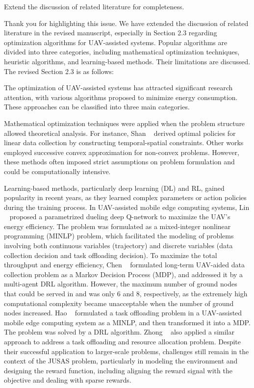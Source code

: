 \begin{metacomment}
	Extend the discussion of related literature for completeness.
\end{metacomment}
\begin{metaresponse}
	Thank you for highlighting this issue.
	We have extended the discussion of related literature in the revised manuscript, especially in Section 2.3 regarding optimization algorithms for UAV-assisted systems.
	Popular algorithms are divided into three categories, including mathematical optimization techniques, heuristic algorithms, and learning-based methods. Their limitations are discussed.
	The revised Section 2.3 is as follows:
	\begin{changes}
		The optimization of UAV-assisted systems has attracted significant research attention, with various algorithms proposed to minimize energy consumption. 
		These approaches can be classified into three main categories.

		Mathematical optimization techniques were applied when the problem structure allowed theoretical analysis. 
		For instance, Shan \etal~\cite{SLXWL-INFOCOM20} derived optimal policies for linear data collection by constructing temporal-spatial constraints. 
		Other works~\cite{b-math1,b-math2} employed successive convex approximation for non-convex problems. 
		However, these methods often imposed strict assumptions on problem formulation and could be computationally intensive.

		Learning-based methods, particularly deep learning (DL) and RL, gained popularity in recent years, as they learned complex parameters or action policies during the training process.
		In UAV-assisted mobile edge computing systems, Lin \etal~\cite{b-DL} proposed a parametrized dueling deep Q-network to maximize the UAV's energy efficiency.
		The problem was formulated as a mixed-integer nonlinear programming (MINLP) problem, which facilitated the modeling of problems involving both continuous variables (\eg trajectory) and discrete variables (\eg data collection decision and task offloading decision).
		To maximize the total throughput and energy efficiency, Chen \etal~\cite{b-RL} formulated long-term UAV-aided data collection problem as a Markov Decision Process (MDP), and addressed it by a multi-agent DRL algorithm.
		However, the maximum number of ground nodes that could be served in \cite{b-DL} and \cite{b-RL} was only 6 and 8, respectively, as the extremely high computational complexity became unacceptable when the number of ground nodes increased.
		Hao \etal~\cite{hao-minlp} formulated a task offloading problem in a UAV-assisted mobile edge computing system as a MINLP, and then transformed it into a MDP.
		The problem was solved by a DRL algorithm.
		Zhong \etal~\cite{zhong-minlp} also applied a similar approach to address a task offloading and resource allocation problem.
		Despite their successful application to larger-scale problems, challenges still remain in the context of the JUSAS problem, particularly in modeling the environment and designing the reward function, including aligning the reward signal with the objective and dealing with sparse rewards.


\end{changes}
\end{metaresponse}
